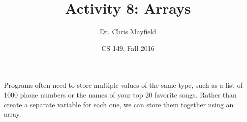 \documentclass[12pt]{article}
\title{Activity 8: Arrays}
\author{Dr. Chris Mayfield}
\date{CS 149, Fall 2016}
\begin{document}
\maketitle

Programs often need to store multiple values of the same type, such as a list of 1000 phone numbers or the names of your top 20 favorite songs.
Rather than create a separate variable for each one, we can store them together using an array.




\end{document}
